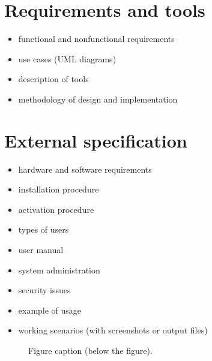 \documentclass[a4paper,twoside,12pt]{book}
\begin{document}


\chapter{Requirements and tools}

\begin{itemize}
\item functional and nonfunctional requirements
\item use cases (UML diagrams)
\item description of tools
\item methodology of design and implementation
\end{itemize}

\chapter{External specification}
\begin{itemize}
\item hardware and software requirements
\item installation procedure
\item activation procedure
\item types of users
\item user manual
\item system administration
\item security issues
\item example of usage
\item working scenarios (with screenshots or output files)
\end{itemize}




\begin{figure}
\centering
{}
\caption{Figure caption (below the figure).}
\label{fig:2}
\end{figure}
\end{document}
